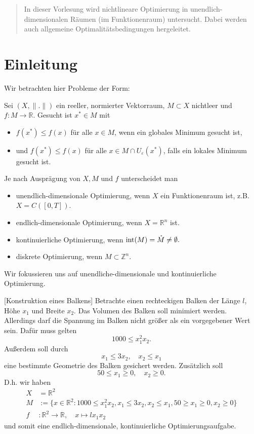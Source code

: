 \documentclass[main.tex]{subfiles}
\begin{document}
\begin{abstract}
    In dieser Vorlesung wird nichtlineare Optimierung in unendlich-dimensionalen Räumen (im Funktionenraum) untersucht. Dabei werden auch allgemeine Optimalitätsbedingungen hergeleitet.
\end{abstract}

\chapter{Einleitung}
Wir betrachten hier Probleme der Form:

Sei $(X, \|.\|)$ ein reeller, normierter Vektorraum, $M\subset X$ nichtleer und $f\colon M\to ℝ$. Gesucht ist $x^*\in M$ mit \begin{itemize}
    \item $f(x^*)\le f(x)$ für alle $x\in M$, wenn ein globales Minimum gesucht ist, 
    \item und $f(x^*)\le f(x)$ für alle $x\in M\cap U_ε(x^*)$, falls ein lokales Minimum gesucht ist.
\end{itemize}
Je nach Ausprägung von $X,M$ und $f$ unterscheidet man
\begin{itemize}
    \item unendlich-dimensionale Optimierung, wenn $X$ ein Funktionenraum ist, z.B. $X = C([0,T])$.
    \item endlich-dimensionale Optimierung, wenn $X = ℝ^n$ ist.
    \item kontinuierliche Optimierung, wenn $\operatorname{int} (M) = \mathring{M} \ne \emptyset.$
    \item diskrete Optimierung, wenn $M\subset ℤ^n$.
\end{itemize}
Wir fokussieren uns auf unendliche-dimensionale und kontinuierliche Optimierung.

\begin{bsp}\label{1.1}[Konstruktion eines Balkens]
Betrachte einen rechteckigen Balken der Länge $l$, Höhe $x_1$ und Breite $x_2$. Das Volumen des Balken soll minimiert werden. Allerdings darf die Spannung im Balken nicht größer als ein vorgegebener Wert sein. Dafür muss gelten
$$1000 \le x_1^2 x_2.$$
Außerdem soll durch
$$x_1 \le 3x_2, \quad x_2 \le x_1$$
eine bestimmte Geometrie des Balken gesichert werden. Zusätzlich soll
$$50 \le x_1 \ge 0, \quad x_2 \ge 0.$$
D.h. wir haben
\begin{align*}
    X &= ℝ^2\\
    M &:= \{ x\in ℝ^2: 1000\le x_1^2 x_2 , x_1 \le 3 x_2, x_2 \le x_1, 50 \ge x_1 \ge 0, x_2 \ge 0\}\\
    f&\colon ℝ^2 \to ℝ, \quad x \mapsto lx_1x_2
\end{align*}
und somit eine endlich-dimensionale, kontinuierliche Optimierungsaufgabe.
\end{bsp}
\end{document}
